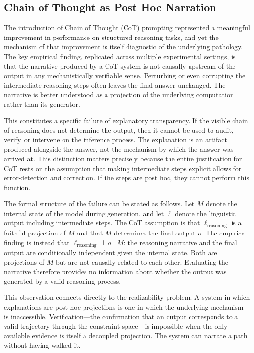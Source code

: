 \documentclass[12pt, oneside]{article}
\begin{document}
\subsection{Chain of Thought as Post Hoc Narration}

The introduction of Chain of Thought (CoT) prompting represented a meaningful improvement in performance on structured reasoning tasks, and yet the mechanism of that improvement is itself diagnostic of the underlying pathology. The key empirical finding, replicated across multiple experimental settings, is that the narrative produced by a CoT system is not causally upstream of the output in any mechanistically verifiable sense. Perturbing or even corrupting the intermediate reasoning steps often leaves the final answer unchanged. The narrative is better understood as a projection of the underlying computation rather than its generator.

This constitutes a specific failure of explanatory transparency. If the visible chain of reasoning does not determine the output, then it cannot be used to audit, verify, or intervene on the inference process. The explanation is an artifact produced alongside the answer, not the mechanism by which the answer was arrived at. This distinction matters precisely because the entire justification for CoT rests on the assumption that making intermediate steps explicit allows for error-detection and correction. If the steps are post hoc, they cannot perform this function.

The formal structure of the failure can be stated as follows. Let $M$ denote the internal state of the model during generation, and let $\ell$ denote the linguistic output including intermediate steps. The CoT assumption is that $\ell_{\text{reasoning}}$ is a faithful projection of $M$ and that $M$ determines the final output $o$. The empirical finding is instead that $\ell_{\text{reasoning}} \perp o \mid M$: the reasoning narrative and the final output are conditionally independent given the internal state. Both are projections of $M$ but are not causally related to each other. Evaluating the narrative therefore provides no information about whether the output was generated by a valid reasoning process.

This observation connects directly to the realizability problem. A system in which explanations are post hoc projections is one in which the underlying mechanism is inaccessible. Verification---the confirmation that an output corresponds to a valid trajectory through the constraint space---is impossible when the only available evidence is itself a decoupled projection. The system can narrate a path without having walked it.
\end{document}
